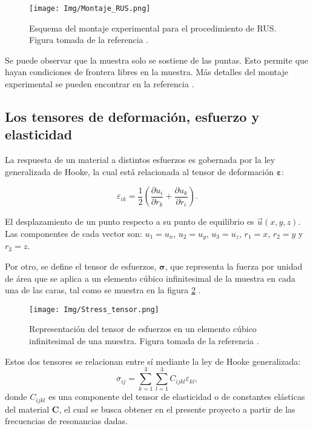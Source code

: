 \documentclass[12pt]{article}
\begin{document}
\begin{figure}[H]
    \centering
    \texttt{[image: Img/Montaje\_RUS.png]}
    \caption{Esquema del montaje experimental para el procedimiento de RUS. Figura tomada de la referencia \cite{Leisure_1997}.}
    \label{fig:montaje_rus}
\end{figure}

Se puede observar que la muestra solo se sostiene de las puntas. Esto permite que hayan condiciones de frontera libres en la muestra. Más detalles del montaje experimental se pueden encontrar en la referencia \cite{MIGLIORI19931}.

\subsection{Los tensores de deformación, esfuerzo y elasticidad}

La respuesta de un material a distintos esfuerzos es gobernada por la ley generalizada de Hooke, la cual está relacionada al tensor de deformación $\bm{\varepsilon}$:

\begin{equation}
    \varepsilon_{ik} = \frac{1}{2} \left(\frac{\partial u_i}{\partial r_k} + \frac{\partial u_k}{\partial r_i} \right).
	\label{eq:deformación}
\end{equation}

El desplazamiento de un punto respecto a su punto de equilibrio es $\vec{u}{(x,y,z)}$. Las componentes de cada vector son: $u_1 = u_x$, $u_2 = u_y$, $u_3 = u_z$, $r_1 = x$, $r_2 = y$ y $r_3 = z$.

Por otro, se define el tensor de esfuerzos, $\bm{\sigma}$, que representa la fuerza por unidad de área que se aplica a un elemento cúbico infinitesimal de la muestra en cada una de las caras, tal como se muestra en la figura \ref{fig:tensor_esfuerzos} \cite{oliveira2020}.

\begin{figure}[H]
    \centering
    \texttt{[image: Img/Stress\_tensor.png]}
    \caption{Representación del tensor de esfuerzos en un elemento cúbico infinitesimal de una muestra. Figura tomada de la referencia \cite{oliveira2020}.}
    \label{fig:tensor_esfuerzos}
\end{figure}

Estos dos tensores se relacionan entre sí mediante la ley de Hooke generalizada:
\begin{equation}
	\sigma_{ij} = \sum_{k=1}^{3}\sum_{l=1}^{3}C_{ijkl}\varepsilon_{kl},
\end{equation}
donde $C_{ijkl}$ es una componente del tensor de elasticidad o de constantes elásticas del material $\bm{C}$, el cual se busca obtener en el presente proyecto a partir de las frecuencias de resonancias dadas. 
\end{document}
